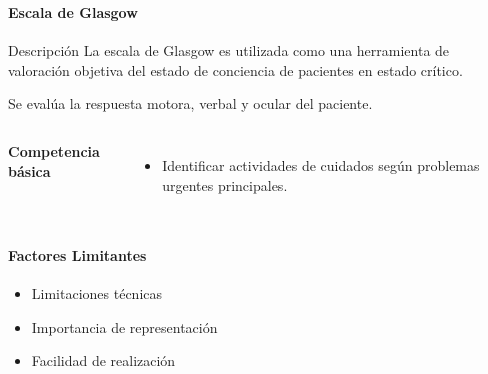 \begin{frame}
    \frametitle{\pagetitle}
    \framesubtitle{Escala de Glasgow}
    
    \begin{block}{Descripción}
    \centering
    La escala de Glasgow es utilizada como una herramienta de valoración
    objetiva del estado de conciencia de pacientes en estado crítico. 
    
    Se evalúa la respuesta motora, verbal y ocular del paciente.
    \end{block}

	\begin{columns}
	 \hspace{0.5cm}
    \centering
    
     \hspace{0.5cm}
    \textbf{Competencia básica}
    \begin{itemize}
	\item Identificar actividades de cuidados según problemas urgentes principales.
	\end{itemize}
	\end{columns}

\end{frame}

\begin{frame}
    \frametitle{\pagetitle}
    \framesubtitle{Factores Limitantes}
	\begin{itemize}[<+->]
	\item Limitaciones técnicas
	\item Importancia de representación
	\item Facilidad de realización
	\end{itemize}
\end{frame}

